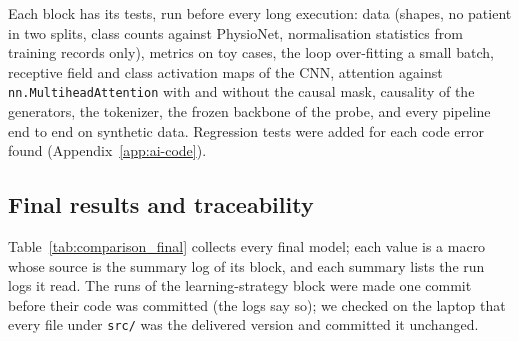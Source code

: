 Each block has its tests, run before every long execution: data (shapes, no patient in two splits, class
counts against PhysioNet, normalisation statistics from training records only), metrics on toy cases,
the loop over-fitting a small batch, receptive field and class activation maps of the CNN, attention
against \texttt{nn.MultiheadAttention} with and without the causal mask, causality of the generators,
the tokenizer, the frozen backbone of the probe, and every pipeline end to end on synthetic data.
Regression tests were added for each code error found (Appendix~\ref{app:ai-code}).

\subsection{Final results and traceability}



Table~\ref{tab:comparison_final} collects every final model; each value is a macro whose source is the
summary log of its block, and each summary lists the run logs it read. The runs of the learning-strategy
block were made one commit before their code was committed (the logs say so); we checked on the laptop
that every file under \texttt{src/} was the delivered version and committed it unchanged.
